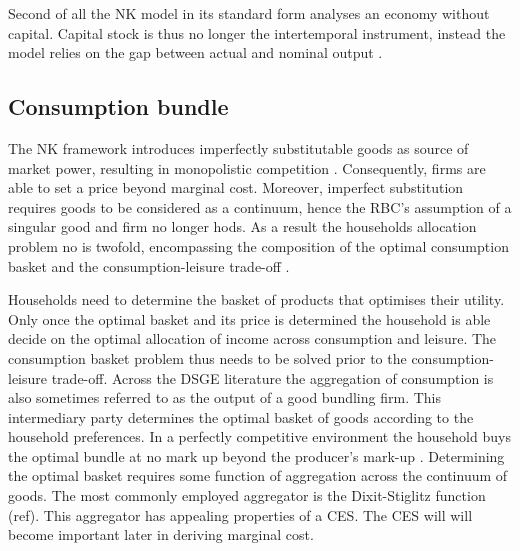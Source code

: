 \documentclass[12pt,a4paper,english]{article} %
\begin{document}
	Second of all the NK model in its standard form analyses an economy without capital. Capital stock is thus no longer the intertemporal instrument, instead the model relies on the gap between actual and nominal output \cite{gali_monetary_2008}.
		
	\subsection{Consumption bundle}
	The \ac{NK} framework introduces imperfectly substitutable goods as source of market power, resulting in monopolistic competition \cite{gali_monetary_2008}. Consequently, firms are able to set a price beyond marginal cost. Moreover, imperfect substitution requires goods to be considered as a continuum, hence the RBC's assumption of a singular good and firm no longer hods. As a result the households allocation problem no is twofold, encompassing the composition of the optimal consumption basket and the consumption-leisure trade-off \cite{gali_monetary_2008}.
	
	Households need to determine the basket of products that optimises their utility. Only once the optimal basket and its price is determined the household is able decide on the optimal allocation of income across consumption and leisure. The consumption basket problem thus needs to be solved prior to the consumption-leisure trade-off. Across the DSGE literature the aggregation of consumption is also sometimes referred to as the output of a good bundling firm. This intermediary party determines the optimal basket of goods according to the household preferences. In a perfectly competitive environment the household buys the optimal bundle at no mark up beyond the producer's mark-up \cite{gali_monetary_2008}.
	Determining the optimal basket requires some function of aggregation across the continuum of goods. The most commonly employed aggregator is the Dixit-Stiglitz function (ref). This aggregator has appealing properties of a \ac{CES}. The CES will will become important later in deriving marginal cost.
	
\end{document}
